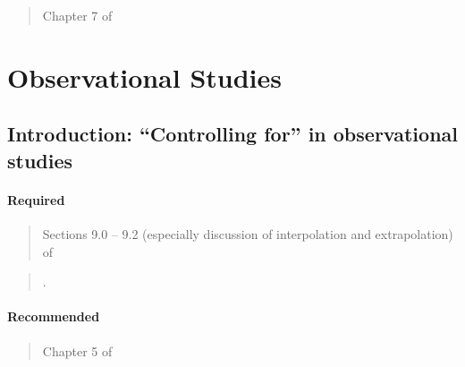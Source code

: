 \documentclass[12pt]{article}
\newcommand{\bibverse}[1]{\begin{verse} \bibentry{#1}. \end{verse}}
\begin{document}
\begin{verse} Chapter 7 of  \end{verse}

\begin{verse}  \end{verse}

\begin{verse}  \end{verse}

\begin{verse}  \end{verse}

\begin{verse}  \end{verse}

\section{Observational Studies}

\subsection{Introduction:  ``Controlling for'' in observational studies}

\paragraph*{Required}

\begin{verse}  \end{verse}

\begin{verse} Sections 9.0 -- 9.2 (especially discussion of interpolation and extrapolation) of  \end{verse}

\bibverse{berk2010}

\paragraph*{Recommended}

\begin{verse} Chapter 5 of  \end{verse}

\begin{verse}  \end{verse}
\end{document}
